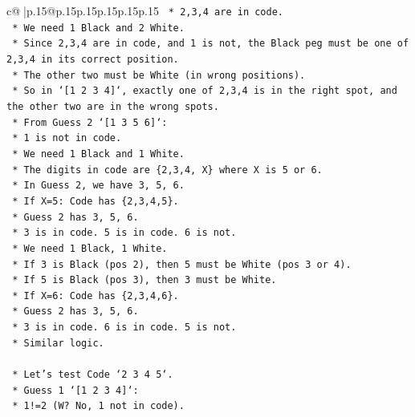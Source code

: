 \documentclass{article}
\begin{document}
{\begin{supertabular}{c@{$\;$}|p{.15\linewidth}@{}p{.15\linewidth}p{.15\linewidth}p{.15\linewidth}p{.15\linewidth}p{.15\linewidth}}
{{{\texttt{                    *   2,3,4 are in code.} \\
\texttt{                    *   We need 1 Black and 2 White.} \\
\texttt{                    *   Since 2,3,4 are in code, and 1 is not, the Black peg must be one of 2,3,4 in its correct position.} \\
\texttt{                    *   The other two must be White (in wrong positions).} \\
\texttt{                    *   So in `{[}1 2 3 4{]}`, exactly one of 2,3,4 is in the right spot, and the other two are in the wrong spots.} \\
\texttt{                *   From Guess 2 `{[}1 3 5 6{]}`:} \\
\texttt{                    *   1 is not in code.} \\
\texttt{                    *   We need 1 Black and 1 White.} \\
\texttt{                    *   The digits in code are \{2,3,4, X\} where X is 5 or 6.} \\
\texttt{                    *   In Guess 2, we have 3, 5, 6.} \\
\texttt{                    *   If X=5: Code has \{2,3,4,5\}.} \\
\texttt{                        *   Guess 2 has 3, 5, 6.} \\
\texttt{                        *   3 is in code. 5 is in code. 6 is not.} \\
\texttt{                        *   We need 1 Black, 1 White.} \\
\texttt{                        *   If 3 is Black (pos 2), then 5 must be White (pos 3 or 4).} \\
\texttt{                        *   If 5 is Black (pos 3), then 3 must be White.} \\
\texttt{                    *   If X=6: Code has \{2,3,4,6\}.} \\
\texttt{                        *   Guess 2 has 3, 5, 6.} \\
\texttt{                        *   3 is in code. 6 is in code. 5 is not.} \\
\texttt{                        *   Similar logic.} \\
\\ 
\texttt{            *   Let's test Code `2 3 4 5`.} \\
\texttt{                *   Guess 1 `{[}1 2 3 4{]}`:} \\
\texttt{                    *   1!=2 (W? No, 1 not in code).} \\
}}}
\end{supertabular}}
\end{document}
